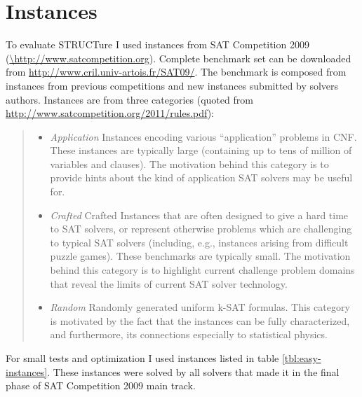 \chapter{Instances}
\label{app:instances}


To evaluate STRUCTure I used instances from SAT Competition 2009
(\url{\http://www.satcompetition.org}). Complete benchmark set can be
downloaded from \url{http://www.cril.univ-artois.fr/SAT09/}. The
benchmark is composed from instances from previous
competitions and new instances submitted by solvers
authors.  Instances are from three categories (quoted from
\url{http://www.satcompetition.org/2011/rules.pdf}):


\begin{quote}
  \begin{itemize}
    \item \emph{Application} Instances encoding various “application”
    problems in CNF.  These instances are typically large (containing up
    to tens of million of variables and clauses). The motivation behind
    this category is to provide hints about the kind of application
    SAT solvers may be useful for.

    \item \emph{Crafted} Crafted Instances that are often designed to
    give a hard time to SAT solvers, or represent otherwise problems
    which are challenging to typical SAT solvers (including, e.g.,
    instances arising from difficult puzzle games).  These benchmarks
    are typically small. The motivation behind this category is to
    highlight current challenge problem domains that reveal the limits
    of current SAT solver technology.


    \item \emph{Random} Randomly generated uniform k-SAT formulas.
    This category is motivated by the fact that the instances can be
    fully characterized, and furthermore, its connections especially
    to statistical physics.

  \end{itemize}
\end{quote}


For small tests and optimization I used instances listed in table
\ref{tbl:easy-instances}. These instances were solved by all solvers
that made it in the final phase of SAT Competition 2009 main track.

